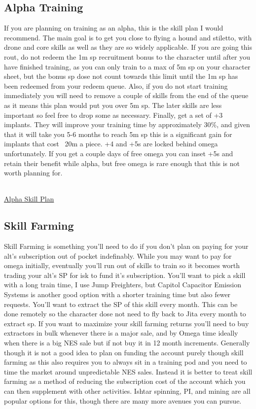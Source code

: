 \documentclass{article}
\begin{document}
\subsection{Alpha Training}
If you are planning on training as an alpha, this is the skill plan I would recommend. The main goal is to get you close to flying a hound and stiletto,
with drone and core skills as well as they are so widely applicable. If you are going this rout, do not redeem the 1m sp recruitment bonus to the 
character until after you have finished training, as you can only train to a max of 5m sp on your character sheet, but the bonus sp dose not count
towards this limit until the 1m sp has been redeemed from your redeem queue. Also, if you do not start training immediately you will need to remove
a couple of skills from the end of the queue as it means this plan would put you over 5m sp. The later skills are less important so feel free to drop 
some as necessary. Finally, get a set of +3 implants. They will improve your training time by approximately 30\%, and given that it will take you 5-6 months
to reach 5m sp this is a significant gain for implants that cost ~20m a piece. +4 and +5s are locked behind omega unfortunately. If you get a couple days
of free omega you can inset +5s and retain their benefit while alpha, but free omega is rare enough that this is not worth planning for.
\\
\\
\begin{center}
\hyperref[alphaSkillplan]{Alpha Skill Plan}
\end{center}


\clearpage
\subsection{Skill Farming}
Skill Farming is something you'll need to do if you don't plan on paying for your alt's subscription out of pocket indefinably. While you may want to pay 
for omega initially, eventually you'll run out of skills to train so it becomes worth trading your alt's SP for isk to fund it's subscription. You'll want 
to pick a skill with a long train time, I use Jump Freighters, but Capitol Capacitor Emission Systems is another good option with a shorter training time 
but also fewer requests. You'll want to extract the SP of this skill every month. This can be done remotely so the character dose not need to fly back to 
Jita every month to extract sp. If you want to maximize your skill farming returns you'll need to buy extractors in bulk whenever there is a major sale, 
and by Omega time ideally when there is a big NES sale but if not buy it in 12 month increments. Generally though it is not a good idea to plan on funding
the account purely though skill farming as this also requires you to always sit in a training pod and you need to time the market around unpredictable NES
sales. Instead it is better to treat skill farming as a method of reducing the subscription cost of the account which you can then supplement with other
activities. Ishtar spinning, PI, and mining are all popular options for this, though there are many more avenues you can pursue.
\end{document}

